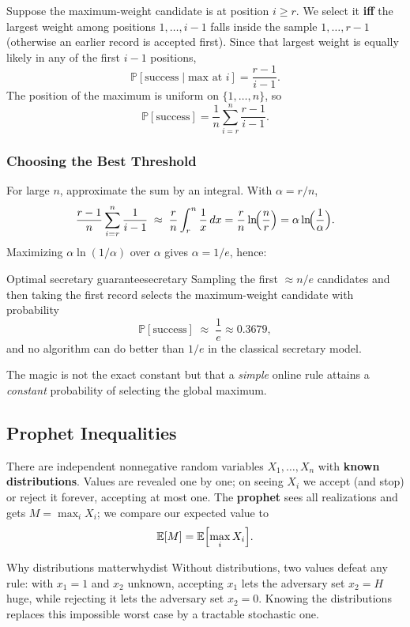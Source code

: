 Suppose the maximum-weight candidate is at position $i \ge r$. We select it \textbf{iff} the largest weight among positions $1, \dots, i-1$ falls inside the sample $1, \dots, r-1$ (otherwise an earlier record is accepted first). Since that largest weight is equally likely in any of the first $i-1$ positions,
\[
\mathbb{P}[\text{success} \mid \text{max at } i] = \frac{r-1}{i-1}.
\]
The position of the maximum is uniform on $\{1, \dots, n\}$, so
\[
\mathbb{P}[\text{success}] = \frac{1}{n}\sum_{i=r}^{n} \frac{r-1}{i-1}.
\]

\subsubsection{Choosing the Best Threshold}

For large $n$, approximate the sum by an integral. With $\alpha = r/n$,
\[
\frac{r-1}{n}\sum_{i=r}^{n}\frac{1}{i-1} \;\approx\; \frac{r}{n}\int_r^n \frac{1}{x}\,dx = \frac{r}{n}\ln\!\Bigl(\frac{n}{r}\Bigr) = \alpha \ln\!\Bigl(\frac1\alpha\Bigr).
\]
Maximizing $\alpha \ln(1/\alpha)$ over $\alpha$ gives $\alpha = 1/e$, hence:

\begin{theorem}{Optimal secretary guarantee}{secretary}
Sampling the first $\approx n/e$ candidates and then taking the first record selects the maximum-weight candidate with probability
\[
\mathbb{P}[\text{success}] \;\approx\; \frac{1}{e} \approx 0.3679,
\]
and no algorithm can do better than $1/e$ in the classical secretary model.
\end{theorem}

The magic is not the exact constant but that a \emph{simple} online rule attains a \emph{constant} probability of selecting the global maximum.

\subsection{Prophet Inequalities}

There are independent nonnegative random variables $X_1, \dots, X_n$ with \textbf{known distributions}. Values are revealed one by one; on seeing $X_i$ we accept (and stop) or reject it forever, accepting at most one. The \textbf{prophet} sees all realizations and gets $M = \max_i X_i$; we compare our expected value to
\[
\mathbb{E}[M] = \mathbb{E}\Bigl[\max_i X_i\Bigr].
\]

\begin{remark}{Why distributions matter}{whydist}
Without distributions, two values defeat any rule: with $x_1 = 1$ and $x_2$ unknown, accepting $x_1$ lets the adversary set $x_2 = H$ huge, while rejecting it lets the adversary set $x_2 = 0$. Knowing the distributions replaces this impossible worst case by a tractable stochastic one.
\end{remark}

